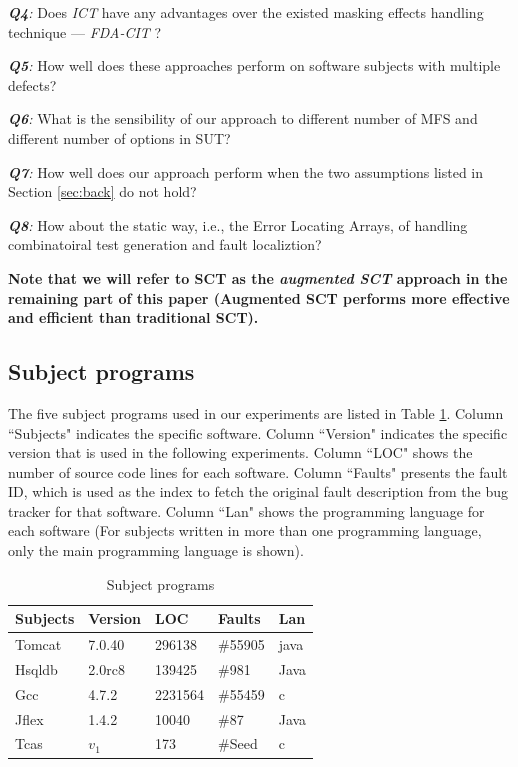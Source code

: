\documentclass[10pt,journal,compsoc]{IEEEtran}
\begin{document}
\emph{\textbf{Q4}:} Does \emph{ICT} have any advantages over the existed masking effects handling technique --- \emph{FDA-CIT} \cite{yilmaz2013reducing}?

{\color{blue}\emph{\textbf{Q5}:} How well does these approaches perform on software subjects with multiple defects?}


\emph{\textbf{Q6}:} What is the sensibility of our approach to different number of MFS and different number of options in SUT?


\emph{\textbf{Q7}:} How well does our approach perform when the two assumptions listed in Section \ref{sec:back} do not hold?


{\color{blue}\emph{\textbf{Q8}:} How about the static way, i.e., the Error Locating Arrays, of handling combinatoiral test generation and fault localiztion?}


\textbf{Note that we will refer to SCT as the \emph{augmented SCT} approach in the remaining part of this paper (Augmented SCT performs more effective and efficient than traditional SCT).}


\subsection{Subject programs}\label{sec:subject}
The five subject programs used in our experiments are listed in Table \ref{subject}. Column ``Subjects" indicates the specific software. Column ``Version" indicates the specific version that is used in the following experiments. Column ``LOC" shows the number of source code lines for each software. Column ``Faults" presents the fault ID, which is used as the index to fetch the original fault description from the bug tracker for that software. Column ``Lan" shows the programming language for each software (For subjects written in more than one programming language, only the main programming language is shown).

\begin{table}[ht]
\caption{Subject programs}
\label{subject}
\centering
\begin{tabular}{l|l|l|l|l}
\hline
Subjects & Version & LOC & Faults &  Lan \\
\hline
Tomcat   &   7.0.40      & 296138    &   \#55905  & java  \\
Hsqldb   &   2.0rc8  &   139425   &    \#981  & Java \\
Gcc      &   4.7.2      &  2231564   & \#55459   &  c\\
Jflex    &    1.4.2     & 10040    &    \#87   & Java \\
Tcas     & $v_{1}$     &   173  &    \#Seed   & c \\ \hline
\end{tabular}

\end{table}
\end{document}
